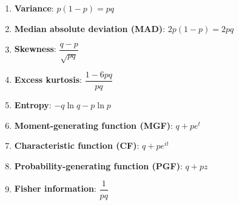 \begin{enumerate}
    \item \textbf{Variance}:
    $
         {\displaystyle p(1-p)=pq}
    $
    \hfill \cite{wiki/Bernoulli_distribution}

    \item \textbf{Median absolute deviation (MAD)}:
    $
         {\displaystyle 2p(1-p)=2pq}
    $
    \hfill \cite{wiki/Bernoulli_distribution}

    \item \textbf{Skewness}:
    $
         {\displaystyle {\dfrac {q-p}{\sqrt {pq}}}}
    $
    \hfill \cite{wiki/Bernoulli_distribution}

    \item \textbf{Excess kurtosis}:
    $
         {\displaystyle {\dfrac {1-6pq}{pq}}}
    $
    \hfill \cite{wiki/Bernoulli_distribution}

    \item \textbf{Entropy}:
    $
         {\displaystyle -q\ln q-p\ln p}
    $
    \hfill \cite{wiki/Bernoulli_distribution}

    \item \textbf{Moment-generating function (MGF)}:
    $
         {\displaystyle q+pe^{t}}
    $
    \hfill \cite{wiki/Bernoulli_distribution}

    \item \textbf{Characteristic function (CF)}:
    $
         {\displaystyle q+pe^{it}}
    $
    \hfill \cite{wiki/Bernoulli_distribution}

    \item \textbf{Probability-generating function (PGF)}:
    $
         {\displaystyle q+pz}
    $
    \hfill \cite{wiki/Bernoulli_distribution}

    \item \textbf{Fisher information}:
    $
         {\displaystyle {\dfrac {1}{pq}}}
    $
    \hfill \cite{wiki/Bernoulli_distribution}
\end{enumerate}





